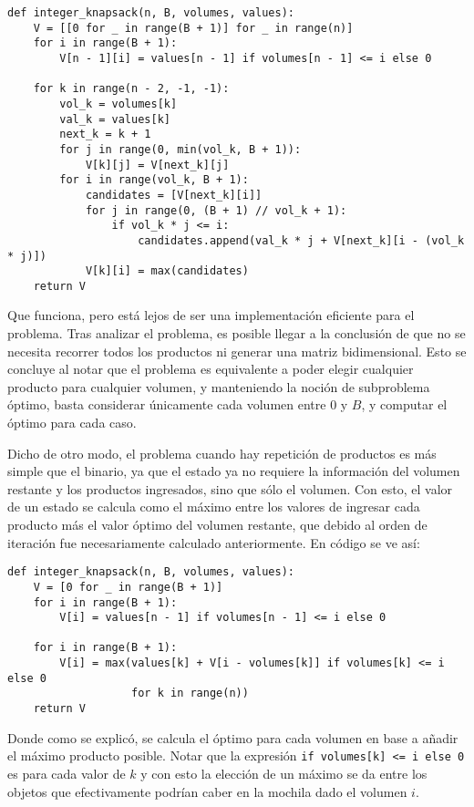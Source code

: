 \documentclass[letterpaper,10pt]{article}
\begin{document}
  \begin{lstlisting}[columns=fullflexible]
  def integer_knapsack(n, B, volumes, values):
    V = [[0 for _ in range(B + 1)] for _ in range(n)]
    for i in range(B + 1):
        V[n - 1][i] = values[n - 1] if volumes[n - 1] <= i else 0

    for k in range(n - 2, -1, -1):
        vol_k = volumes[k]
        val_k = values[k]
        next_k = k + 1
        for j in range(0, min(vol_k, B + 1)):
            V[k][j] = V[next_k][j]
        for i in range(vol_k, B + 1):
            candidates = [V[next_k][i]]
            for j in range(0, (B + 1) // vol_k + 1):
                if vol_k * j <= i:
                    candidates.append(val_k * j + V[next_k][i - (vol_k * j)])
            V[k][i] = max(candidates)
    return V
  \end{lstlisting}

  Que funciona, pero está lejos de ser una implementación eficiente para el problema. Tras analizar el problema, es posible llegar a la conclusión de que no se necesita recorrer todos los productos ni generar una matriz bidimensional. Esto se concluye al notar que el problema es equivalente a poder elegir cualquier producto para cualquier volumen, y manteniendo la noción de subproblema óptimo, basta considerar únicamente cada volumen entre 0 y $B$, y computar el óptimo para cada caso.
  
  Dicho de otro modo, el problema cuando hay repetición de productos es más simple que el binario, ya que el estado ya no requiere la información del volumen restante y los productos ingresados, sino que sólo el volumen. Con esto, el valor de un estado se calcula como el máximo entre los valores de ingresar cada producto más el valor óptimo del volumen restante, que debido al orden de iteración fue necesariamente calculado anteriormente. En código se ve así:

  \begin{lstlisting}[columns=fullflexible]
  def integer_knapsack(n, B, volumes, values):
    V = [0 for _ in range(B + 1)]
    for i in range(B + 1):
        V[i] = values[n - 1] if volumes[n - 1] <= i else 0

    for i in range(B + 1):
        V[i] = max(values[k] + V[i - volumes[k]] if volumes[k] <= i else 0
                   for k in range(n))
    return V
  \end{lstlisting}
  
  Donde como se explicó, se calcula el óptimo para cada volumen en base a añadir el máximo producto posible. Notar que la expresión \texttt{if volumes[k] <= i else 0} es para cada valor de $k$ y con esto la elección de un máximo se da entre los objetos que efectivamente podrían caber en la mochila dado el volumen $i$.
  
\end{document}
